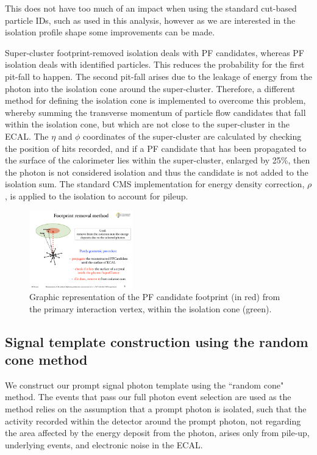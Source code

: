 This does not have too much of an impact when using the standard cut-based particle IDs, such as used in this analysis, however as we are interested in the isolation profile shape some improvements can be made. 

Super-cluster footprint-removed isolation deals with PF candidates, whereas PF isolation deals with identified particles. This reduces the probability for the first pit-fall to happen. The second pit-fall arises due to the leakage of energy from the photon into the isolation cone around the super-cluster. Therefore, a different method for defining the isolation cone is implemented to overcome this problem, whereby summing the transverse momentum of particle flow candidates that fall within the isolation cone, but which are not close to the super-cluster in the ECAL. The $\eta$ and $\phi$ coordinates of the super-cluster are calculated by checking the position of hits recorded, and if a PF candidate that has been propagated to the surface of the calorimeter lies within the super-cluster, enlarged by 25\%, then the photon is not considered isolation and thus the candidate is not added to the isolation sum. The standard CMS implementation for energy density correction, $\rho$, is applied to the isolation to account for pileup. 

\begin{figure} 
\begin{center}
\includegraphics[width=0.4\textwidth]{Figures/RandomCone3.pdf}
\end{center}
\caption{Graphic representation of the PF candidate footprint (in red) from the primary interaction vertex, within the isolation cone (green). \cite{MarcoThesis}}
\label{fig-SCFR}
\end{figure}

\subsection{Signal template construction using the random cone method}

We construct our prompt signal photon template using the ``random cone" method. The events that pass our full photon event selection are used as the method relies on the assumption that a prompt photon is isolated, such that the activity recorded within the detector around the prompt photon, not regarding the area affected by the energy deposit from the photon, arises only from pile-up, underlying events, and electronic noise in the ECAL.  

